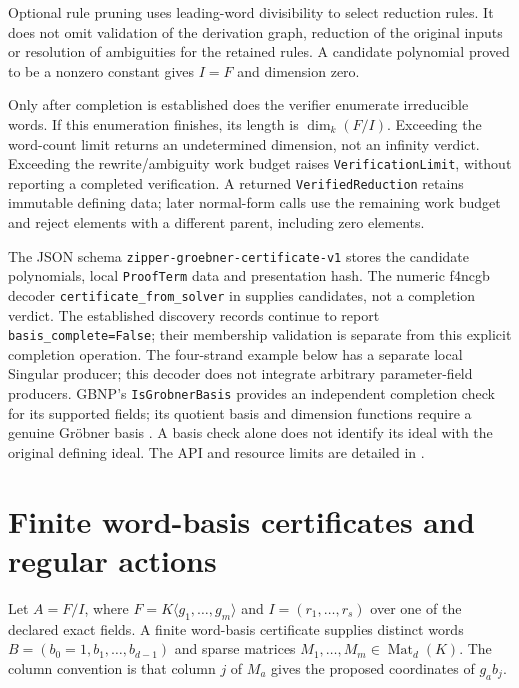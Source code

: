 \documentclass[11pt]{article}
\begin{document}
Optional rule pruning uses leading-word divisibility to select reduction
rules. It does not omit validation of the derivation graph, reduction of the
original inputs or resolution of ambiguities for the retained rules.
A candidate polynomial proved to be a nonzero constant gives $I=F$ and
dimension zero.

Only after completion is established does the verifier enumerate irreducible
words. If this enumeration finishes, its length is $\dim_k(F/I)$. Exceeding
the word-count limit returns an undetermined dimension, not an infinity
verdict. Exceeding the rewrite/ambiguity work budget raises
\texttt{VerificationLimit}, without reporting a completed verification.
A returned \texttt{VerifiedReduction} retains immutable defining data;
later normal-form calls use the remaining work budget and reject elements
with a different parent, including zero elements.

The JSON schema \texttt{zipper-groebner-certificate-v1} stores the candidate
polynomials, local \texttt{ProofTerm} data and presentation hash. The numeric
f4ncgb decoder \texttt{certificate\_from\_solver} in
 supplies candidates, not a completion verdict.
The established discovery records continue to report
\texttt{basis\_complete=False}; their membership validation is separate from
this explicit completion operation. The four-strand example below has a separate local Singular producer; this
decoder does not integrate arbitrary parameter-field producers. GBNP's \texttt{IsGrobnerBasis} provides an
independent completion check for its supported fields; its quotient basis
and dimension functions require a genuine Gr\"obner basis \cite{gbnp}.
A basis check alone does not identify its ideal with the original defining
ideal. The API and resource limits are detailed in
.

\section{Finite word-basis certificates and regular actions}
Let $A=F/I$, where $F=K\langle g_1,\ldots,g_m\rangle$ and
$I=(r_1,\ldots,r_s)$ over one of the declared exact fields. A finite word-basis
certificate supplies distinct words $B=(b_0=1,b_1,\ldots,b_{d-1})$ and sparse
matrices $M_1,\ldots,M_m\in\operatorname{Mat}_d(K)$. The column convention is
that column $j$ of $M_a$ gives the proposed coordinates of $g_ab_j$.
\end{document}
